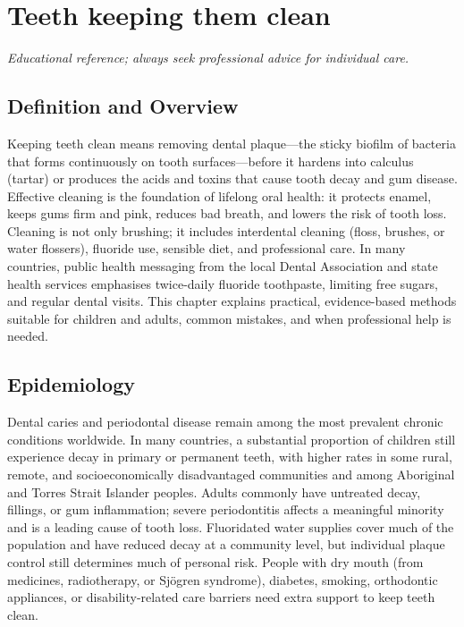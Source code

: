 \chapter{Teeth keeping them clean}

\medskip
\noindent\textit{Educational reference; always seek professional advice for individual care.}

\section*{Definition and Overview}
Keeping teeth clean means removing dental plaque---the sticky biofilm of bacteria that forms continuously on tooth surfaces---before it hardens into calculus (tartar) or produces the acids and toxins that cause tooth decay and gum disease. Effective cleaning is the foundation of lifelong oral health: it protects enamel, keeps gums firm and pink, reduces bad breath, and lowers the risk of tooth loss. Cleaning is not only brushing; it includes interdental cleaning (floss, brushes, or water flossers), fluoride use, sensible diet, and professional care. In many countries, public health messaging from the local Dental Association and state health services emphasises twice-daily fluoride toothpaste, limiting free sugars, and regular dental visits. This chapter explains practical, evidence-based methods suitable for children and adults, common mistakes, and when professional help is needed.

\section*{Epidemiology}
Dental caries and periodontal disease remain among the most prevalent chronic conditions worldwide. In many countries, a substantial proportion of children still experience decay in primary or permanent teeth, with higher rates in some rural, remote, and socioeconomically disadvantaged communities and among Aboriginal and Torres Strait Islander peoples. Adults commonly have untreated decay, fillings, or gum inflammation; severe periodontitis affects a meaningful minority and is a leading cause of tooth loss. Fluoridated water supplies cover much of the population and have reduced decay at a community level, but individual plaque control still determines much of personal risk. People with dry mouth (from medicines, radiotherapy, or Sjögren syndrome), diabetes, smoking, orthodontic appliances, or disability-related care barriers need extra support to keep teeth clean.


